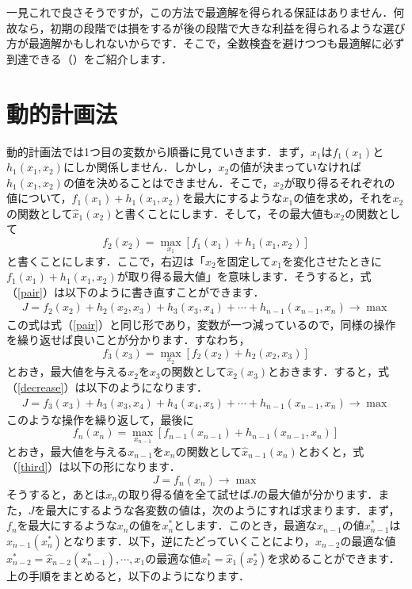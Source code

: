 \documentclass[a5paper]{jarticle}
\begin{document}
一見これで良さそうですが，この方法で最適解を得られる保証はありません．何故なら，初期の段階では損をするが後の段階で大きな利益を得られるような選び方が最適解かもしれないからです．そこで，全数検査を避けつつも最適解に必ず到達できる（）をご紹介します．
\section{動的計画法}
動的計画法では1つ目の変数から順番に見ていきます．まず，$x_1$は$f_1(x_1)$と$h_1(x_1, x_2)$にしか関係しません．しかし，$x_2$の値が決まっていなければ$h_1(x_1, x_2)$の値を決めることはできません．そこで，$x_2$が取り得るそれぞれの値について，$f_1(x_1) + h_1(x_1, x_2)$を最大にするような$x_1$の値を求め，それを$x_2$の関数として$\hat x_1(x_2)$と書くことにします．そして，その最大値も$x_2$の関数として
\[
f_2(x_2) = \max_{x_1}[f_1(x_1) + h_1(x_1, x_2)]
\]
と書くことにします．ここで，右辺は「$x_2$を固定して$x_1$を変化させたときに$f_1(x_1) + h_1(x_1, x_2)$が取り得る最大値」を意味します．そうすると，式（\ref{pair}）は以下のように書き直すことができます．
\begin{eqnarray}
\label{decrease}
J = f_2(x_2) + h_2(x_2, x_3)+ h_3(x_3, x_4) + \cdots + h_{n - 1}(x_{n - 1}, x_n) \rightarrow \max
\end{eqnarray}
この式は式（\ref{pair}）と同じ形であり，変数が一つ減っているので，同様の操作を繰り返せば良いことが分かります．すなわち，
\[
f_3(x_3) = \max_{x_2}[f_2(x_2) + h_2(x_2, x_3)]
\]
とおき，最大値を与える$x_2$を$x_3$の関数として$\hat x_2(x_3)$とおきます．すると，式（\ref{decrease}）は以下のようになります．
\begin{eqnarray}
\label{third}
J = f_3(x_3) + h_3(x_3, x_4)+ h_4(x_4, x_5) + \cdots + h_{n - 1}(x_{n - 1}, x_n) \rightarrow \max
\end{eqnarray}
このような操作を繰り返して，最後に
\[
f_n(x_n) = \max_{x_{n - 1}}[f_{n - 1}(x_{n - 1}) + h_{n - 1}(x_{n - 1}, x_n)]
\]
とおき，最大値を与える$x_{n - 1}$を$x_n$の関数として$\hat x_{n - 1}(x_n)$とおくと，式（\ref{third}）は以下の形になります．
\[
J = f_n(x_n) \rightarrow \max
\]
そうすると，あとは$x_n$の取り得る値を全て試せば$J$の最大値が分かります．また，$J$を最大にするような各変数の値は，次のようにすれば求まります．まず，$f_n$を最大にするような$x_n$の値を$x_n^*$とします．このとき，最適な$x_{n - 1}$の値$x_{n - 1}^*$は$\hat x_{n - 1}(x_n^*)$となります．以下，逆にたどっていくことにより，$x_{n - 2}$の最適な値$x_{n - 2}^* = \hat x_{n - 2}(x_{n - 1}^*), \cdots, x_1$の最適な値$x_1^* = \hat x_1(x_2^*)$を求めることができます．上の手順をまとめると，以下のようになります．
\end{document}
